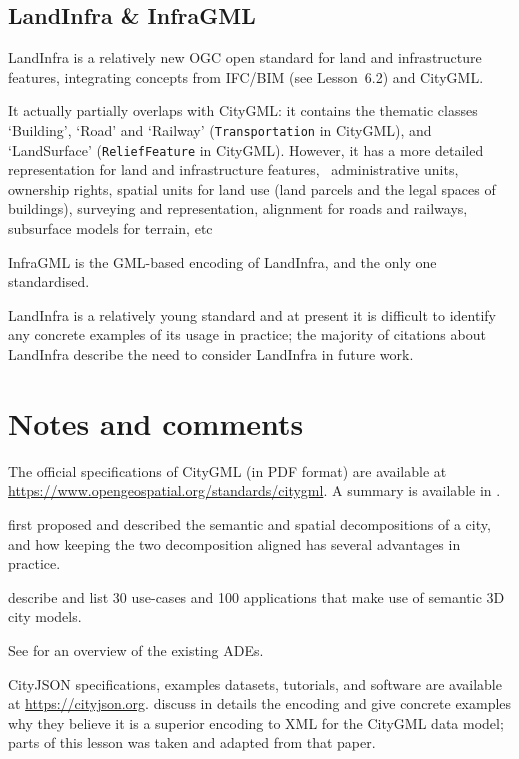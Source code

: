 

\subsection{LandInfra \& InfraGML}

LandInfra is a relatively new OGC open standard for land and infrastructure features, integrating concepts from IFC/BIM (see Lesson~6.2) and CityGML\@.

It actually partially overlaps with CityGML: it contains the thematic classes `Building', `Road' and `Railway' (\texttt{Transportation} in CityGML), and `LandSurface' (\texttt{ReliefFeature} in CityGML). 
However, it has a more detailed representation for land and infrastructure features, \eg\ administrative units, ownership rights, spatial units for land use (land parcels and the legal spaces of buildings), surveying and representation, alignment for roads and railways, subsurface models for terrain, etc

InfraGML is the GML-based encoding of LandInfra, and the only one standardised.

LandInfra is a relatively young standard and at present it is difficult to identify any concrete examples of its usage in practice; the majority of citations about LandInfra describe the need to consider LandInfra in future work.


%
\section{Notes and comments}

The official specifications of CityGML (in PDF format) are available at \url{https://www.opengeospatial.org/standards/citygml}.
A summary is available in \citet{Groger12}.

\citep{Stadler07} first proposed and described the semantic and spatial decompositions of a city, and how keeping the two decomposition aligned has several advantages in practice.

\citet{Biljecki15a} describe and list 30 use-cases and 100 applications that make use of semantic 3D city models.

See \citet{Biljecki18} for an overview of the existing ADEs.

CityJSON specifications, examples datasets, tutorials, and software are available at \url{https://cityjson.org}.
\citet{Ledoux19} discuss in details the encoding and give concrete examples why they believe it is a superior encoding to XML for the CityGML data model; parts of this lesson was taken and adapted from that paper.

